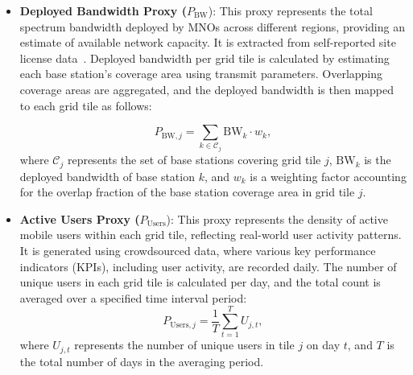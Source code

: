 \documentclass[conference]{IEEEtran}
\begin{document}
\begin{itemize}
    \item \textbf{Deployed Bandwidth Proxy (\(P_{\text{BW}}\)}): This proxy represents the total spectrum bandwidth deployed by MNOs across different regions, providing an estimate of available network capacity. It is extracted from self-reported site license data~\cite{ised_site}. Deployed bandwidth per grid tile is calculated by estimating each base station's coverage area using transmit parameters. Overlapping coverage areas are aggregated, and the deployed bandwidth is then mapped to each grid tile as follows:
    
    \begin{equation}\label{eq:proxy_bw}
    P_{\text{BW}, j} = \sum_{k \in \mathcal{C}_j} \text{BW}_k \cdot w_k,
    \end{equation}
    where \(\mathcal{C}_j\) represents the set of base stations covering grid tile \(j\), \(\text{BW}_k\) is the deployed bandwidth of base station \(k\), and \(w_k\) is a weighting factor accounting for the overlap fraction of the base station coverage area in grid tile \(j\).
    \item \textbf{Active Users Proxy (\(P_{\text{Users}}\)}): This proxy represents the density of active mobile users within each grid tile, reflecting real-world user activity patterns. It is generated using crowdsourced data, where various key performance indicators (KPIs), including user activity, are recorded daily. The number of unique users in each grid tile is calculated per day, and the total count is averaged over a specified time interval period:  
    \begin{equation}\label{eq:proxy_user}
    P_{\text{Users}, j} = \frac{1}{T} \sum_{t=1}^T U_{j,t},
    \end{equation}  
    where \(U_{j,t}\) represents the number of unique users in tile \(j\) on day \(t\), and \(T\) is the total number of days in the averaging period.
 


\end{itemize}
\end{document}
